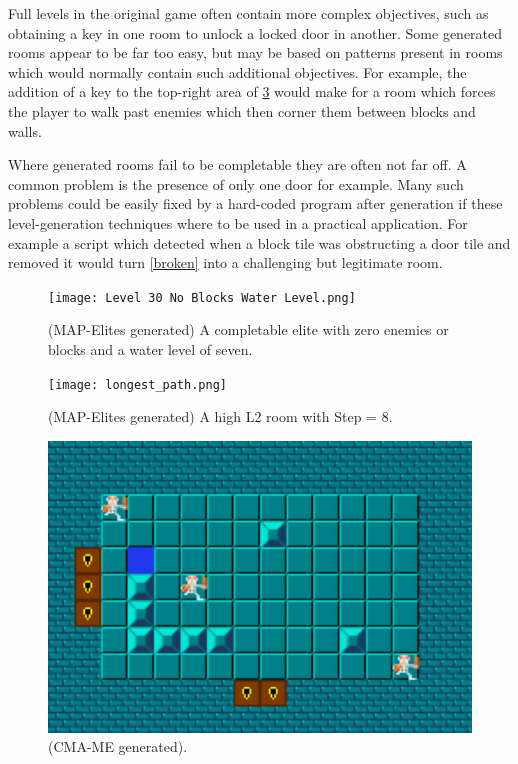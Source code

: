 \documentclass{article}
\begin{document}
Full levels in the original game often contain more complex objectives, such as obtaining a key in one room to unlock a locked door in another. Some generated rooms appear to be far too easy, but may be based on patterns present in rooms which would normally contain such additional objectives. For example, the addition of a key to the top-right area of \ref{additional mechanics} would make for a room which forces the player to walk past enemies which then corner them between blocks and walls.

Where generated rooms fail to be completable they are often not far off. A common problem is the presence of only one door for example. Many such problems could be easily fixed by a hard-coded program after generation if these level-generation techniques where to be used in a practical application. For example a script which detected when a block tile was obstructing a door tile and removed it would turn \ref{broken} into a challenging but legitimate room.


\begin{figure}
    \centering
    \texttt{[image: Level 30 No Blocks Water Level.png]}
    \caption{(MAP-Elites generated) A completable elite with zero enemies or blocks and a water level of seven.}
    \label{level 30}
\end{figure}

\begin{figure}
    \centering
    \texttt{[image: longest\_path.png]}
    \caption{(MAP-Elites generated) A high L2 room with Step = 8.}
    \label{level longest}
\end{figure}

\begin{figure}
    \centering
    \includegraphics[width=\linewidth]{CMAME 9100 Boring.png}
    \caption{(CMA-ME generated).}
    \label{additional mechanics}
\end{figure}
\end{document}
